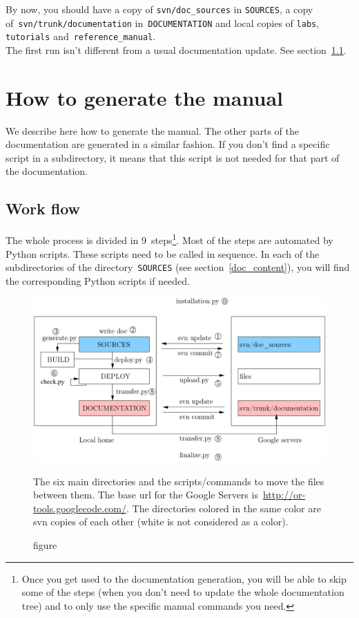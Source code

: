\documentclass[a4paper,10pt]{article}
\newcommand{\code}[1]{\texttt{#1}}
\begin{document}
By now, you should have a copy of \code{svn/doc\_sources} in \code{SOURCES}, a copy of~\code{svn/trunk/documentation} in~\code{DOCUMENTATION} and local copies of \code{labs}, \code{tutorials} and~\code{reference\_manual}.\\

The first run isn't different from a usual documentation update. See section~\ref{work_flow}.

\section{How to generate the manual}

We describe here how to generate the manual. The other parts of the documentation are generated in a similar fashion.
If you don't find a specific script in a subdirectory, it means that this script is not needed for that part of the  documentation.

\subsection{Work flow}
\label{work_flow}

The whole process is divided in 9~steps\footnote{Once you get used to the documentation generation, you will be able to skip some of the steps (when you don't need to update the whole documentation tree) and to only use the specific manual commands you need.}. Most of the steps are automated by Python scripts. These scripts need to be called in sequence. In each of the subdirectories of the directory~\code{SOURCES} (see section~\ref{doc_content}), you will find the corresponding Python scripts if needed.\\


\begin{figure}[h]
   \centering
   \includegraphics[scale=0.8]{images/directories.pdf}
   \caption{figure}{The six main directories and the scripts/commands to move the files between them. The base url for the Google Servers is~\href{http://or-tools.googlecode.com/}{http://or-tools.googlecode.com/}. The directories colored in the same color are svn copies of each other (white is not considered as a color).}\label{pic_directories}
 \end{figure}
\end{document}
